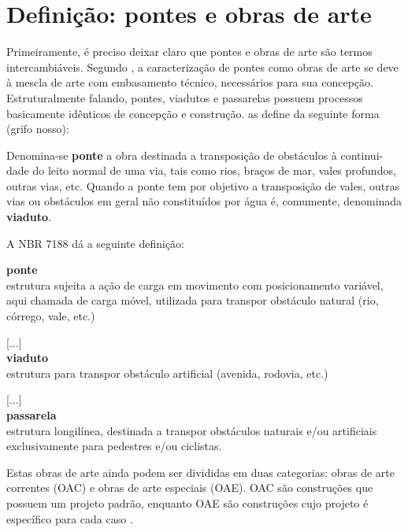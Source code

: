 \section{Definição: pontes e obras de arte}

Primeiramente, é preciso deixar claro que pontes e obras de arte são termos intercambiáveis.
Segundo , a caracterização de pontes como obras de arte se deve à mescla de
arte com embasamento técnico, necessários para sua concepção. Estruturalmente falando, pontes, viadutos
e passarelas possuem processos basicamente idênticos de concepção e construção.  as
define da seguinte forma (grifo nosso):

\begin{citacao}
Denomina-se \textbf{ponte} a obra destinada a transposição de obstáculos à continui-
dade do leito normal de uma via, tais como rios, braços de mar, vales profundos,
outras vias, etc. Quando a ponte tem por objetivo a transposição de vales,
outras vias ou obstáculos em geral não constituídos por água é, comumente,
denominada \textbf{viaduto}.
\end{citacao}

A NBR 7188 \cite[p.~1, grifo do autor]{NBR7188:2013} dá a seguinte definição:

\begin{citacao}
\textbf{ponte}\\
estrutura sujeita a ação de carga em movimento com posicionamento variável,
aqui chamada de carga móvel, utilizada para transpor obstáculo natural (rio,
córrego, vale, etc.)

[...]\\
\textbf{viaduto}\\
estrutura para transpor obstáculo artificial (avenida, rodovia, etc.)

[...]\\
\textbf{passarela}\\
estrutura longilínea, destinada a transpor obstáculos naturais e/ou artificiais
exclusivamente para pedestres e/ou ciclistas.
\end{citacao}


Estas obras de arte ainda podem ser divididas em duas categorias: obras de arte correntes (OAC)
e obras de arte especiais (OAE). OAC são construções que possuem um projeto padrão, enquanto OAE
são construções cujo projeto é específico para cada caso \cite{Franca}.

